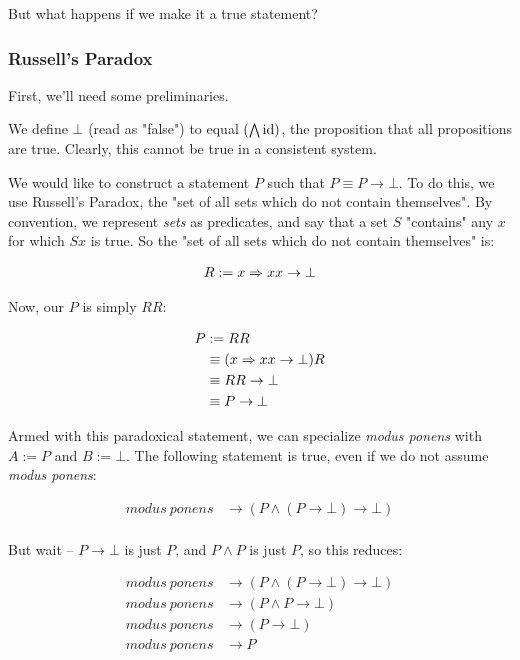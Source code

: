 \documentclass{article}
\begin{document}
  But what happens if we make it a true statement?
  
  \subsubsection{Russell's Paradox}
  
  First, we'll need some preliminaries.
  
  We define $\bot$ (read as "false") to equal $(\bigwedge \operatorname{\mathrm{id}})$, the proposition that all propositions are true. Clearly, this cannot be true in a consistent system.
  
  We would like to construct a statement $P$ such that $P \equiv P \to \bot$. To do this, we use Russell's Paradox, the "set of all sets which do not contain themselves". By convention, we represent \emph{sets} as predicates, and say that a set $S$ "contains" any $x$ for which $S x$ is true. So the "set of all sets which do not contain themselves" is:
  
  \begin{align*}
    R := x \Rightarrow x x \to \bot
  \end{align*}
  
  Now, our $P$ is simply $RR$:
  
  \begin{align*}
    P &:= RR\\
      &\equiv (x \Rightarrow x x \to \bot)R\\
      &\equiv RR \to \bot\\
      &\equiv P \to \bot\\
  \end{align*}
  
  Armed with this paradoxical statement, we can specialize \emph{modus ponens} with $A := P$ and $B := \bot$. The following statement is true, even if we do not assume \emph{modus ponens}:
  
  \begin{align*}
    modus\ ponens &\to (P \wedge (P \to \bot) \to \bot)\\
  \end{align*}
  
  But wait – $P \to \bot$ is just $P$, and $P \wedge P$ is just $P$, so this reduces:
  
  \begin{align*}
    modus\ ponens &\to (P \wedge (P \to \bot) \to \bot)\\
    modus\ ponens &\to (P \wedge P \to \bot)\\
    modus\ ponens &\to (P \to \bot)\\
    modus\ ponens &\to P\\
  \end{align*}
  
\end{document}
